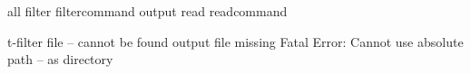 

\startmodule    [filter]

\unprotect


\startinterface all
             {filter}
      {filtercommand}
             {output} 
               {read} 
        {readcommand} 
\stopinterface

\def\m!externalfilter{t-filter}


     {\m!externalfilter}
  {file -- cannot be found}
   {output file missing}
 {Fatal Error: Cannot use absolute path -- as directory}


\def\??externalfilter??{externalfilter}
\def\currentexternalfilter{}
\def\externalfiltercountername{\??externalfilter??-\currentexternalfilter-counter}


